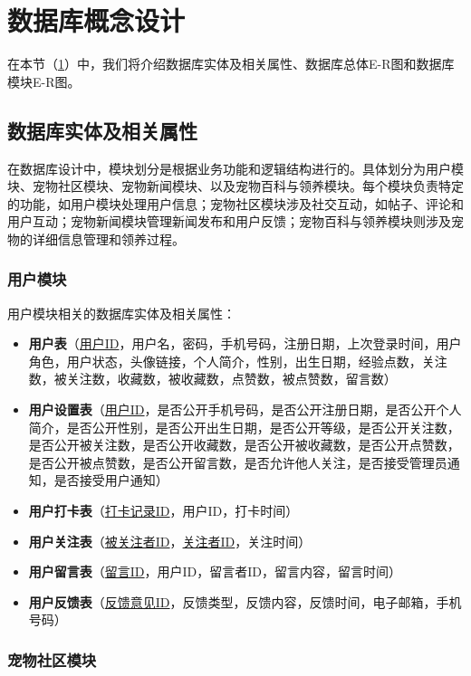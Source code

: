 \section{数据库概念设计}\label{sec:ConceptualDesign}

在本节（\cref{sec:ConceptualDesign}）中，我们将介绍数据库实体及相关属性、数据库总体E-R图和数据库模块E-R图。

\subsection{数据库实体及相关属性}

在数据库设计中，模块划分是根据业务功能和逻辑结构进行的。具体划分为用户模块、宠物社区模块、宠物新闻模块、以及宠物百科与领养模块。每个模块负责特定的功能，如用户模块处理用户信息；宠物社区模块涉及社交互动，如帖子、评论和用户互动；宠物新闻模块管理新闻发布和用户反馈；宠物百科与领养模块则涉及宠物的详细信息管理和领养过程。

\subsubsection{用户模块}

用户模块相关的数据库实体及相关属性：

\begin{itemize}
    \item \textbf{用户表}（\underline{用户ID}，用户名，密码，手机号码，注册日期，上次登录时间，用户角色，用户状态，头像链接，个人简介，性别，出生日期，经验点数，关注数，被关注数，收藏数，被收藏数，点赞数，被点赞数，留言数）
    \item \textbf{用户设置表}（\underline{用户ID}，是否公开手机号码，是否公开注册日期，是否公开个人简介，是否公开性别，是否公开出生日期，是否公开等级，是否公开关注数，是否公开被关注数，是否公开收藏数，是否公开被收藏数，是否公开点赞数，是否公开被点赞数，是否公开留言数，是否允许他人关注，是否接受管理员通知，是否接受用户通知）
    \item \textbf{用户打卡表}（\underline{打卡记录ID}，用户ID，打卡时间）
    \item \textbf{用户关注表}（\underline{被关注者ID}，\underline{关注者ID}，关注时间）
    \item \textbf{用户留言表}（\underline{留言ID}，用户ID，留言者ID，留言内容，留言时间）
    \item \textbf{用户反馈表}（\underline{反馈意见ID}，反馈类型，反馈内容，反馈时间，电子邮箱，手机号码）
\end{itemize}

\subsubsection{宠物社区模块}


